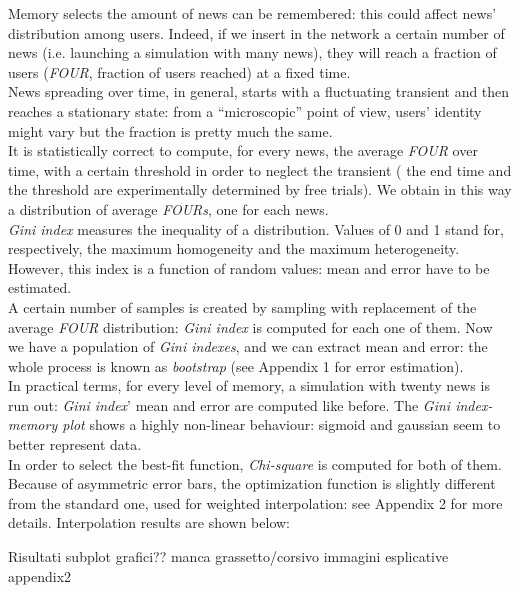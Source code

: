 
Memory selects the amount of news can be remembered: this could affect news' distribution among users.
Indeed, if we insert in the network a certain number of news (i.e. launching a simulation with many news), they will reach a fraction of users (\textit{FOUR}, fraction of users reached) at a fixed time.\\
News spreading over time, in general, starts with a fluctuating transient and then reaches a stationary state: from a ``microscopic'' point of view, users' identity might vary but the fraction is pretty much the same. \\
It is statistically correct to compute, for every news, the average \textit{FOUR} over time, with a certain threshold in order to neglect the transient ( the end time and the threshold are experimentally determined by free trials).
We obtain in this  way a distribution of average \textit{FOURs}, one for each news.\\
\textit{Gini index} measures the inequality of a distribution. Values of 0 and 1 stand for, respectively, the maximum homogeneity and the maximum heterogeneity.
However, this index is a function of random values: mean and error have to be estimated.\\
A certain number of samples is created by sampling with replacement of the average \textit{FOUR} distribution: \textit{Gini index} is computed for each one of them.
Now we have a population of \textit{Gini indexes}, and we can extract mean and error: the whole process is known as \textit{bootstrap} (see Appendix 1 for error estimation).\\
In practical terms, for every level of  memory, a simulation with twenty news is run out: \textit{Gini index}' mean and error are computed like before.
The \textit{Gini index-memory plot} shows a highly non-linear behaviour: sigmoid and gaussian seem to better represent data.\\
 In order to select the best-fit function, \textit{Chi-square} is computed for both of them. \\
Because of asymmetric error bars, the optimization function is slightly different from the standard one, used for weighted interpolation: see Appendix 2 for more details.
Interpolation results are shown below:


Risultati
subplot grafici??
manca grassetto/corsivo
immagini esplicative appendix2
